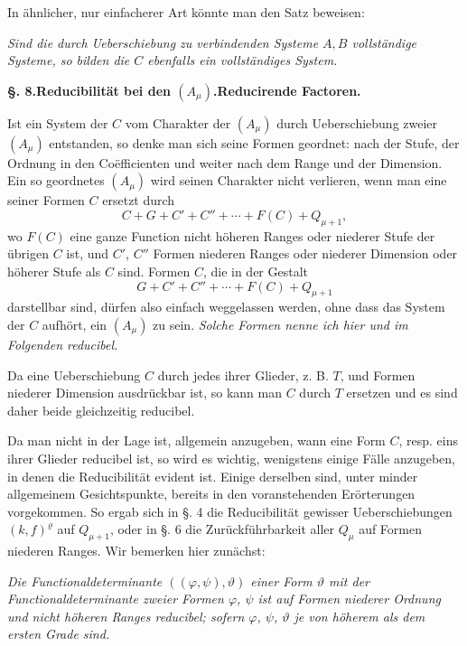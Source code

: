 \documentclass[10pt]{article}
\begin{document}
In ähnlicher, nur einfacherer Art könnte man den Satz beweisen:

\emph{Sind die durch Ueberschiebung zu verbindenden Systeme $A,B$ vollständige Systeme, so bilden die $C$ ebenfalls ein vollständiges System.}

\begin{center}
{\bfseries §. 8.\quad Reducibilität bei den $(A_\mu)$.\quad Reducirende Factoren.}
\end{center}

Ist ein System der $C$ vom Charakter der $(A_\mu)$ durch Ueberschiebung zweier $(A_\mu)$ entstanden, so denke man sich seine Formen geordnet: nach der Stufe, der Ordnung in den Coëfficienten und weiter nach dem Range und der Dimension. Ein so geordnetes $(A_\mu)$ wird seinen Charakter nicht verlieren, wenn man eine seiner Formen $C$ ersetzt durch
\[
C+G+C'+C''+\cdots+F(C)+Q_{\mu+1},
\]
wo $F(C)$ eine ganze Function nicht höheren Ranges oder niederer Stufe der übrigen $C$ ist, und $C'$, $C''$ Formen niederen Ranges oder niederer Dimension oder höherer Stufe als $C$ sind. Formen $C$, die in der Gestalt
\[
G+C'+C''+\cdots+F(C)+Q_{\mu+1}
\]
darstellbar sind, dürfen also einfach weggelassen werden, ohne dass das System der $C$ aufhört, ein $(A_\mu)$ zu sein. \emph{Solche Formen nenne ich hier und im Folgenden reducibel.}

Da eine Ueberschiebung $C$ durch jedes ihrer Glieder, z. B. $T$, und Formen niederer Dimension ausdrückbar ist, so kann man $C$ durch $T$ ersetzen und es sind daher beide gleichzeitig reducibel.

Da man nicht in der Lage ist, allgemein anzugeben, wann eine Form $C$, resp. eins ihrer Glieder reducibel ist, so wird es wichtig, wenigstens einige Fälle anzugeben, in denen die Reducibilität evident ist. Einige derselben sind, unter minder allgemeinem Gesichtspunkte, bereits in den voranstehenden Erörterungen vorgekommen. So ergab sich in §. 4 die Reducibilität gewisser Ueberschiebungen $(k,f)^\varrho$ auf $Q_{\mu+1}$, oder in §. 6 die Zurückführbarkeit aller $Q_\mu$ auf Formen niederen Ranges. Wir bemerken hier zunächst:

\emph{Die Functionaldeterminante $((\varphi,\psi),\vartheta)$ einer Form $\vartheta$ mit der Functionaldeterminante zweier Formen $\varphi$, $\psi$ ist auf Formen niederer Ordnung und nicht höheren Ranges reducibel; sofern $\varphi$, $\psi$, $\vartheta$ je von höherem als dem ersten Grade sind.}
\end{document}
